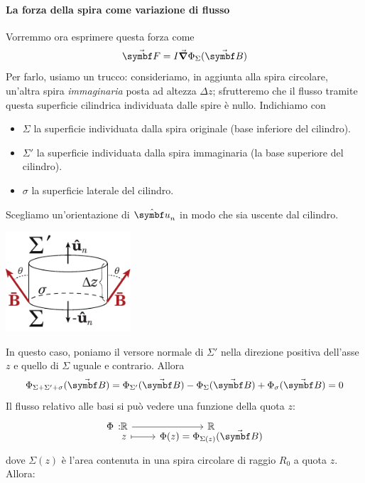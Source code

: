 \paragraph{La forza della spira come variazione di flusso}
Vorremmo ora esprimere questa forza come
\begin{equation*}
	\vba{F}=I\grad{\Phi_{\Sigma}(\vba{B})}
\end{equation*}
Per farlo, usiamo un trucco: consideriamo, in aggiunta alla spira circolare, un'altra spira \textit{immaginaria} posta ad altezza $\Delta z$; sfrutteremo che il flusso tramite questa superficie cilindrica individuata dalle spire è nullo. Indichiamo con
\begin{itemize}
	\item $\Sigma$ la superficie individuata dalla spira originale (base inferiore del cilindro).
	\item $\Sigma'$ la superficie individuata dalla spira immaginaria (la base superiore del cilindro).
	\item $\sigma$ la superficie laterale del cilindro.
\end{itemize}
Scegliamo un'orientazione di $\vbh{u}_n$ in modo che sia uscente dal cilindro.
\begin{center}
	\includegraphics[width=0.35\textwidth]{images/chp8/chp8magnetecilindrico3.pdf}
\end{center}
In questo caso, poniamo il versore normale di $\Sigma'$ nella direzione positiva dell'asse $z$ e quello di $\Sigma$ uguale e contrario. Allora
\begin{equation*}
	\Phi_{\Sigma+\Sigma'+\sigma}(\vba{B})=\Phi_{\Sigma'}(\vba{B})-\Phi_{\Sigma}(\vba{B})+\Phi_{\sigma}(\vba{B})=0
\end{equation*}
Il flusso relativo alle basi si può vedere una funzione della quota $z$:
\begin{equation*}
	\funztot[\Phi]{\realset}{\realset}{z}{\Phi(z)=\Phi_{\Sigma(z)}(\vba{B})}
\end{equation*}
dove $\Sigma(z)$ è l'area contenuta in una spira circolare di raggio $R_0$ a quota $z$. Allora:
